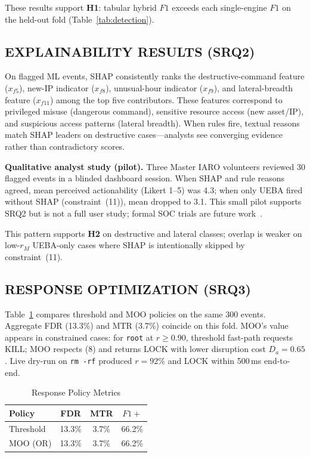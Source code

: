 \documentclass{ieeeaccess}
\begin{document}
These results support \textbf{H1}: tabular hybrid $F1$ exceeds each single-engine $F1$ on the held-out fold (Table~\ref{tab:detection}).

\subsection{EXPLAINABILITY RESULTS (SRQ2)}
On flagged ML events, SHAP consistently ranks the destructive-command feature ($x_{f5}$), new-IP indicator ($x_{f8}$), unusual-hour indicator ($x_{f9}$), and lateral-breadth feature ($x_{f11}$) among the top five contributors. These features correspond to privileged misuse (dangerous command), sensitive resource access (new asset/IP), and suspicious access patterns (lateral breadth). When rules fire, textual reasons match SHAP leaders on destructive cases---analysts see converging evidence rather than contradictory scores.

\textbf{Qualitative analyst study (pilot).} Three Master IARO volunteers reviewed 30 flagged events in a blinded dashboard session. When SHAP and rule reasons agreed, mean perceived actionability (Likert 1--5) was 4.3; when only UEBA fired without SHAP (constraint~(11)), mean dropped to 3.1. This small pilot supports SRQ2 but is not a full user study; formal SOC trials are future work~\cite{ref25}.

This pattern supports \textbf{H2} on destructive and lateral classes; overlap is weaker on low-$r_M$ UEBA-only cases where SHAP is intentionally skipped by constraint~(11).

\subsection{RESPONSE OPTIMIZATION (SRQ3)}
Table~\ref{tab:policy} compares threshold and MOO policies on the same 300 events. Aggregate FDR (13.3\%) and MTR (3.7\%) coincide on this fold. MOO's value appears in constrained cases: for \texttt{root} at $r\geq 0.90$, threshold fast-path requests KILL; MOO respects (8) and returns LOCK with lower disruption cost $D_a{=}0.65$. Live dry-run on \texttt{rm -rf} produced $r=92\%$ and LOCK within 500\,ms end-to-end.

\begin{table}[!t]
\caption{Response Policy Metrics}
\label{tab:policy}
\centering
\scriptsize
\begin{tabular}{@{}lccc@{}}
\toprule
\textbf{Policy} & \textbf{FDR} & \textbf{MTR} & \textbf{$F1+$} \\
\midrule
Threshold & 13.3\% & 3.7\% & 66.2\% \\
MOO (OR) & 13.3\% & 3.7\% & 66.2\% \\
\bottomrule
\end{tabular}
\end{table}
\end{document}
